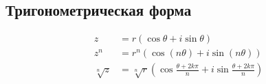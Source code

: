 \documentclass[10pt,landscape,a4paper]{article}
\begin{document}
\begin{multicols}{2}
\subsection{Тригонометрическая форма}
\begin{align}
    z &= r(\cos\theta + i\sin\theta) \\
    z^n &= r^n(\cos(n\theta) + i\sin(n\theta)) \\
    \sqrt[n]{z} &= \sqrt[n]{r}\left(\cos\frac{\theta + 2k\pi}{n} + i\sin\frac{\theta + 2k\pi}{n}\right)
\end{align}

\end{multicols}
\end{document}
